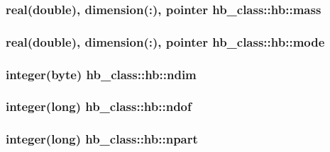 \hypertarget{structhb__class_1_1hb_a245f6fbd55fe85b3c5c7dfda8e9aeadc}{
\subsubsection[{mass}]{\setlength{\rightskip}{0pt plus 5cm}real(double), dimension(\-:), pointer hb\-\_\-class\-::hb\-::mass\hspace{0.3cm}{\ttfamily [private]}}}\label{structhb__class_1_1hb_a245f6fbd55fe85b3c5c7dfda8e9aeadc}
\hypertarget{structhb__class_1_1hb_ac5b121a046f5ee32acc9830d4a9d0583}{
\subsubsection[{mode}]{\setlength{\rightskip}{0pt plus 5cm}real(double), dimension(\-:), pointer hb\-\_\-class\-::hb\-::mode\hspace{0.3cm}{\ttfamily [private]}}}\label{structhb__class_1_1hb_ac5b121a046f5ee32acc9830d4a9d0583}
\hypertarget{structhb__class_1_1hb_ab4c00922e761160b8ec3e3e3bcf41217}{
\subsubsection[{ndim}]{\setlength{\rightskip}{0pt plus 5cm}integer(byte) hb\-\_\-class\-::hb\-::ndim\hspace{0.3cm}{\ttfamily [private]}}}\label{structhb__class_1_1hb_ab4c00922e761160b8ec3e3e3bcf41217}
\hypertarget{structhb__class_1_1hb_a0984c9d5bd990546d1b4b5f804ab3238}{
\subsubsection[{ndof}]{\setlength{\rightskip}{0pt plus 5cm}integer(long) hb\-\_\-class\-::hb\-::ndof\hspace{0.3cm}{\ttfamily [private]}}}\label{structhb__class_1_1hb_a0984c9d5bd990546d1b4b5f804ab3238}
\hypertarget{structhb__class_1_1hb_aa1ccd4393febf95c0c9b30f3e8b23bc3}{
\subsubsection[{npart}]{\setlength{\rightskip}{0pt plus 5cm}integer(long) hb\-\_\-class\-::hb\-::npart\hspace{0.3cm}{\ttfamily [private]}}}\label{structhb__class_1_1hb_aa1ccd4393febf95c0c9b30f3e8b23bc3}
